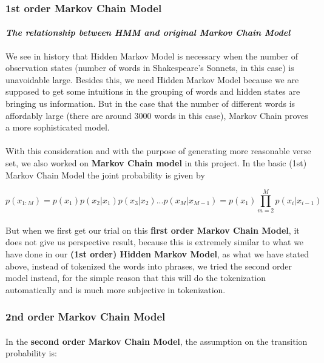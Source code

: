 %
\vspace{5pt}
\subsubsection{1st order Markov Chain Model}
\vspace{5pt}
\paragraph{\textit{The relationship between HMM and original Markov Chain Model}} We see in history that Hidden Markov Model is necessary when the number of observation states (number of words in Shakespeare's Sonnets, in this case) is unavoidable large. Besides this, we need Hidden Markov Model because we are supposed to get some intuitions in the grouping of words and hidden states are bringing us information. But in the case that the number of different words is affordably large (there are around 3000 words in this case), Markov Chain proves a more sophisticated model.
\paragraph{}
With this consideration and with the purpose of generating more reasonable verse set, we also worked on \textbf{Markov Chain model} in this project. In the basic (1st) Markov Chain Model the joint probability is given by

\begin{equation}
  p(x_{1:M}) = p(x_1)p(x_2|x_1)p(x_3|x_2) ...  p(x_M|x_{M-1}) = p(x_1) \prod\limits_{m=2}^M p(x_i|x_{i-1})
\end{equation}
\paragraph{}
But when we first get our trial on this \textbf{first order Markov Chain Model}, it does not give us perspective result, because this is extremely similar to what we have done in our \textbf{(1st order) Hidden Markov Model}, as what we have stated above, instead of tokenized the words into phrases, we tried the second order model instead, for the simple reason that this will do the tokenization automatically and is much more subjective in tokenization.

\subsubsection{2nd order Markov Chain Model}
\paragraph{}
In the \textbf{second order Markov Chain Model}, the assumption on the transition probability is:

